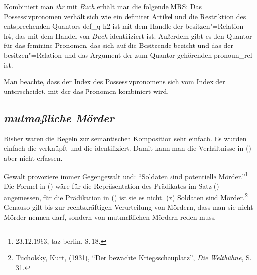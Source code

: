 \zs
Kombiniert man \emph{ihr} mit \emph{Buch} erhält man die folgende MRS:
\ea
{}
\z
Das Possessivpronomen verhält sich wie ein definiter Artikel und die Restriktion des entsprechenden
Quantors def\_q h2 ist \qeq mit dem Handle der besitzen"=Relation h4, das mit dem Handel von
\emph{Buch} identifiziert ist. Außerdem gibt es den Quantor für das feminine Pronomen, das sich auf
die Besitzende bezieht und das \argone der besitzen"=Relation und das Argument der zum Quantor gehörenden pronoun\_rel ist.

Man beachte, dass der Index des Possessivpronomens sich vom Index der \nbar unterscheidet, mit der
das Pronomen kombiniert wird.

\subsection{\emph{mutmaßliche Mörder}}

Bisher waren die Regeln zur semantischen Komposition sehr einfach. Es wurden einfach die \relslen
verknüpft und die \ltopwe identifiziert. Damit kann man die Verhältnisse in () aber nicht erfassen.

\ea
\label{soldat}

Gewalt provoziere immer Gegengewalt und: "`Soldaten sind potentielle Mörder."'\footnote{
23.12.1993, taz berlin, S.\,18.
}
\z
Die Formel in () wäre für die Repräsentation des Prädikates im Satz () angemessen, für
die Prädikation in () ist sie es nicht.
\ea
{}(x)
\z
\ea
Soldaten sind Mörder.\footnote{
  Tucholsky, Kurt, (1931), "`Der bewachte Kriegsschauplatz"', \emph{Die Weltbühne}, S.\,31.
}
\z
Genauso gilt bis zur rechtskräftigen Verurteilung von Mördern, dass man sie nicht Mörder nennen
darf, sondern von mutmaßlichen Mördern reden muss. 

